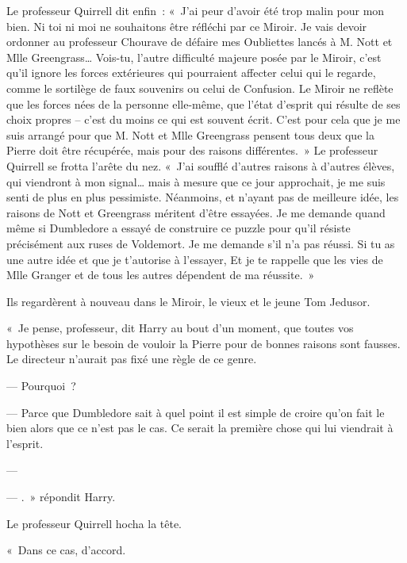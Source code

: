 Le professeur Quirrell dit enfin~: «~J'ai peur d'avoir été trop malin pour mon bien.
Ni toi ni moi ne souhaitons être réfléchi par ce Miroir.
Je vais devoir ordonner au professeur Chourave de défaire mes Oubliettes lancés à M. Nott et Mlle Greengrass…
Vois-tu, l'autre difficulté majeure posée par le Miroir, c'est qu'il ignore les forces extérieures qui pourraient affecter celui qui le regarde, comme le sortilège de faux souvenirs ou celui de Confusion.
Le Miroir ne reflète que les forces nées de la personne elle-même, que l'état d'esprit qui résulte de ses choix propres -- c'est du moins ce qui est souvent écrit.
C'est pour cela que je me suis arrangé pour que M. Nott et Mlle Greengrass pensent tous deux que la Pierre doit être récupérée, mais pour des raisons différentes.~»
Le professeur Quirrell se frotta l'arête du nez.
«~J'ai soufflé d'autres raisons à d'autres élèves, qui viendront à mon signal… mais à mesure que ce jour approchait, je me suis senti de plus en plus pessimiste.
Néanmoins, et n'ayant pas de meilleure idée, les raisons de Nott et Greengrass méritent d'être essayées.
Je me demande quand même si Dumbledore a essayé de construire ce puzzle pour qu'il résiste précisément aux ruses de Voldemort.
Je me demande s'il n'a pas réussi.
Si tu as une autre idée et que je t'autorise à l'essayer,  Et je te rappelle que les vies de Mlle Granger et de tous les autres dépendent de ma réussite.~»

Ils regardèrent à nouveau dans le Miroir, le vieux et le jeune Tom Jedusor.

«~Je pense, professeur, dit Harry au bout d'un moment, que toutes vos hypothèses sur le besoin de vouloir la Pierre pour de bonnes raisons sont fausses.
Le directeur n'aurait pas fixé une règle de ce genre.

--- Pourquoi~?

--- Parce que Dumbledore sait à quel point il est simple de croire qu'on fait le bien alors que ce n'est pas le cas.
Ce serait la première chose qui lui viendrait à l'esprit.

--- 

--- .~»
répondit Harry.

Le professeur Quirrell hocha la tête.

«~Dans ce cas, d'accord.

